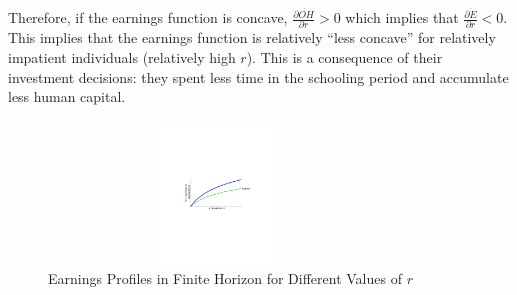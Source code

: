 \indent Therefore, if the earnings function is concave, $\frac{\partial \dot{OH}}{\partial r} > 0$ which implies that $\frac{\partial \dot{E}}{\partial r} < 0$. This implies that the earnings function is relatively ``less concave'' for relatively impatient individuals (relatively high $r$). This is a consequence of their investment decisions: they spent less time in the schooling period and accumulate less human capital.

\begin{center}
\begin{figure}[H]
\caption{Earnings Profiles in Finite Horizon for Different Values of $r$ }
\centering
\includegraphics[width=3.5in, height=1.5in]{Figures/fig-earnings-growth.pdf}
\end{figure}
\end{center}
 










